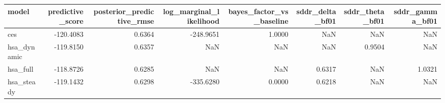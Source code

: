 \begin{tabular}{lrrrrrrr}
\toprule
model & predictive\_score & posterior\_predictive\_rmse & log\_marginal\_likelihood & bayes\_factor\_vs\_baseline & sddr\_delta\_bf01 & sddr\_theta\_bf01 & sddr\_gamma\_bf01 \\
\midrule
ces & -120.4083 & 0.6364 & -248.9651 & 1.0000 & NaN & NaN & NaN \\
hsa\_dynamic & -119.8150 & 0.6357 & NaN & NaN & NaN & 0.9504 & NaN \\
hsa\_full & -118.8726 & 0.6285 & NaN & NaN & 0.6317 & NaN & 1.0321 \\
hsa\_steady & -119.1432 & 0.6298 & -335.6280 & 0.0000 & 0.6218 & NaN & NaN \\
\bottomrule
\end{tabular}
